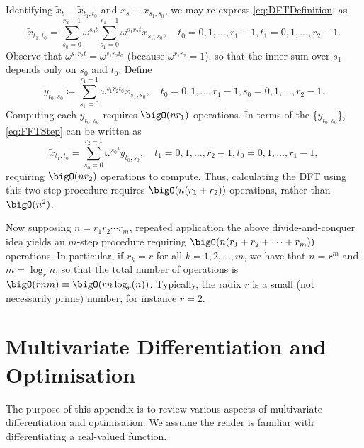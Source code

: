 Identifying $\widetilde{x}_t \equiv \widetilde{x}_{t_1, t_0}$ and $x_s \equiv x_{s_1, s_0}$, we may re-express \eqref{eq:DFTDefinition} as
\begin{equation}
	\widetilde{x}_{t_1, t_0} = \sum_{s_0=0}^{r_2-1} \omega^{s_0 t} \sum_{s_1=0}^{r_1-1} \omega^{s_1 r_2 t} x_{s_1, s_0}, \quad t_0 = 0, 1, \dots, r_1 - 1, t_1 = 0, 1, \dots, r_2 - 1. \label{eq:FFTStep}
\end{equation}
Observe that $\omega^{s_1 r_2 t} = \omega^{s_1 r_2 t_0}$ (because $\omega^{r_1 r_2} = 1$), so that the inner sum over $s_1$ depends only on $s_0$ and $t_0$. Define
\begin{equation*}
	y_{t_0, s_0} \coloneqq \sum_{s_1=0}^{r_1-1} \omega^{s_1 r_2 t_0} x_{s_1, s_0}, \quad t_0 = 0, 1, \dots, r_1 - 1, s_0 = 0, 1, \dots, r_2 - 1.
\end{equation*}
Computing each $y_{t_0, s_0}$ requires $\bigO(n r_1)$ operations. In terms of the $\{y_{t_0, s_0}\}$, \eqref{eq:FFTStep} can be written as
\begin{equation*}
	\widetilde{x}_{t_1, t_0} = \sum_{s_0=0}^{r_2-1} \omega^{s_0 t} y_{t_0, s_0}, \quad t_1 = 0, 1, \dots, r_2 - 1, t_0 = 0, 1, \dots, r_1 - 1,
\end{equation*}
requiring $\bigO(n r_2)$ operations to compute. Thus, calculating the DFT using this two-step procedure requires $\bigO(n(r_1 + r_2))$ operations, rather than $\bigO(n^2)$.

Now supposing $n = r_1 r_2 \cdots r_m$, repeated application the above divide-and-conquer idea yields an $m$-step procedure requiring $\bigO(n(r_1 + r_2 + \dots + r_m))$ operations. In particular, if $r_k = r$ for all $k=1, 2, \dots, m$, we have that $n = r^m$ and $m = \log_r n$, so that the total number of operations is $\bigO(r n m) \equiv \bigO(r n \log_r(n))$. Typically, the radix $r$ is a small (not necessarily prime) number, for instance $r=2$.

\section{Multivariate Differentiation and Optimisation}
The purpose of this appendix is to review various aspects of multivariate differentiation and optimisation. We assume the reader is familiar with differentiating a real-valued function.

